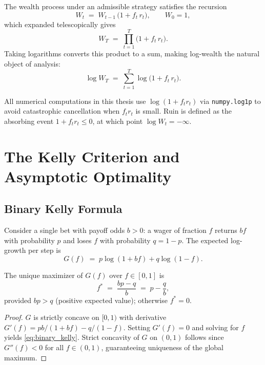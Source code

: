 The wealth process under an admissible strategy satisfies the recursion
\begin{equation}
    W_{t} \;=\; W_{t-1}\,\bigl(1 + f_t\,r_t\bigr), \qquad W_0 = 1,
    \label{eq:wealth_recursion}
\end{equation}
which expanded telescopically gives
\[
    W_T \;=\; \prod_{t=1}^{T} \bigl(1 + f_t\,r_t\bigr).
\]
Taking logarithms converts this product to a sum, making log-wealth the
natural object of analysis:
\[
    \log W_T \;=\; \sum_{t=1}^{T} \log\!\bigl(1 + f_t\,r_t\bigr).
\]
\begin{remark}
All numerical computations in this thesis use $\log(1 + f_t r_t)$ via
\texttt{numpy.log1p} to avoid catastrophic cancellation when $f_t r_t$ is
small.  Ruin is defined as the absorbing event $1 + f_t r_t \leq 0$, at which
point $\log W_t = -\infty$.
\end{remark}

\section{The Kelly Criterion and Asymptotic Optimality}

\subsection{Binary Kelly Formula}

Consider a single bet with payoff odds $b > 0$: a wager of fraction $f$
returns $bf$ with probability $p$ and loses $f$ with probability $q = 1 - p$.
The expected log-growth per step is
\[
    G(f) \;=\; p\log(1+bf) + q\log(1-f).
\]

\begin{proposition}
\label{prop:binary_kelly}
The unique maximizer of $G(f)$ over $f \in [0,1]$ is
\begin{equation}
    f^* \;=\; \frac{bp - q}{b} \;=\; p - \frac{q}{b},
    \label{eq:binary_kelly}
\end{equation}
provided $bp > q$ (positive expected value); otherwise $f^* = 0$.
\end{proposition}

\begin{proof}
$G$ is strictly concave on $[0,1)$ with derivative
$G'(f) = pb/(1+bf) - q/(1-f)$.
Setting $G'(f) = 0$ and solving for $f$ yields \eqref{eq:binary_kelly}.
Strict concavity of $G$ on $(0,1)$ follows since $G''(f) < 0$ for all
$f \in (0,1)$, guaranteeing uniqueness of the global maximum.
\end{proof}

